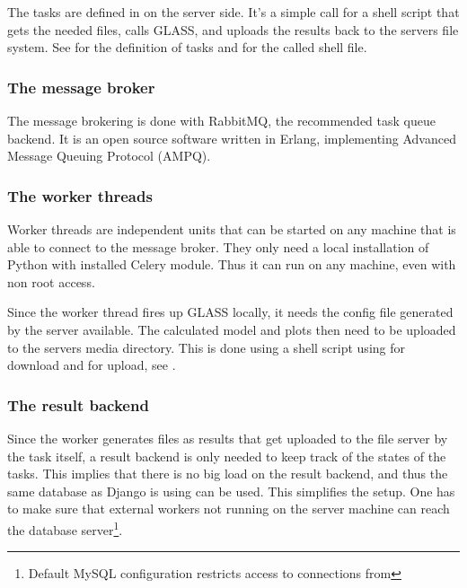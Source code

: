 
The tasks are defined in  on the server side.
It's a simple call for a shell script that gets the needed files, calls GLASS, and uploads the results back to the servers file system.
See  for the definition of tasks and  for the called shell file.



\subsubsection{The message broker}

The message brokering is done with RabbitMQ, the recommended task queue backend.
It is an open source software written in Erlang, implementing Advanced Message Queuing Protocol (AMPQ).

\subsubsection{The worker threads}

Worker threads are independent units that can be started on any machine that is able to connect to the message broker. They only need a local installation of Python with installed Celery module.
Thus it can run on any machine, even with non root access.

Since the worker thread fires up GLASS locally, it needs the config file generated by the server available.
The calculated model and plots then need to be uploaded to the servers media directory.
This is done using a shell script using  for download and  for upload, see .




\subsubsection{The result backend}
Since the worker generates files as results that get uploaded to the file server by the task itself, a result backend is only needed to keep track of the states of the tasks.
This implies that there is no big load on the result backend, and thus the same database as Django is using can be used. This simplifies the setup.
One has to make sure that external workers not running on the server machine can reach the database server\footnote{Default MySQL configuration restricts access to connections from }.




